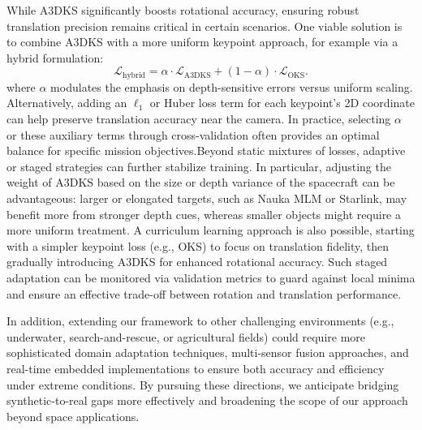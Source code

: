 \documentclass[a4paper,fleqn]{cas-sc}
\begin{document}
While A3DKS significantly boosts rotational accuracy, ensuring robust translation precision remains 
critical in certain scenarios. One viable solution is to combine A3DKS with a more uniform keypoint 
approach, for example via a hybrid formulation:
\begin{equation}
        \mathcal{L}_{\text{hybrid}} 
    = \alpha \cdot \mathcal{L}_{\text{A3DKS}} 
    + (1-\alpha)\cdot \mathcal{L}_{\text{OKS}}.
\end{equation}
where $\alpha$ modulates the emphasis on depth-sensitive errors versus uniform scaling. Alternatively, 
adding an $\ell_1$ or Huber loss term for each keypoint’s 2D coordinate can help preserve translation 
accuracy near the camera. In practice, selecting $\alpha$ or these auxiliary terms through 
cross-validation often provides an optimal balance for specific mission objectives.Beyond static mixtures of losses, adaptive or staged strategies can further stabilize training. In particular, adjusting the weight of A3DKS based on the size or depth variance of the spacecraft can be advantageous: larger or elongated targets, such as Nauka MLM or Starlink, may benefit more from stronger depth cues, whereas smaller objects might require a more uniform treatment. A curriculum learning approach is also possible, starting with a simpler keypoint loss (e.g., OKS) to focus on translation fidelity, then gradually introducing A3DKS for enhanced rotational accuracy. Such staged adaptation can be monitored via validation metrics to guard against local minima and ensure an 
effective trade-off between rotation and translation performance.



In addition, extending our framework to other challenging environments (e.g., 
underwater, search-and-rescue, or agricultural fields) could require more sophisticated 
domain adaptation techniques, multi-sensor fusion approaches, and real-time embedded 
implementations to ensure both accuracy and efficiency under extreme conditions. 
By pursuing these directions, we anticipate bridging synthetic-to-real gaps more effectively 
and broadening the scope of our approach beyond space applications.
\end{document}
